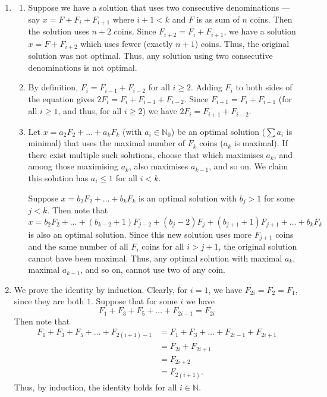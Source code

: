 \documentclass[12 pt, letterpaper]{hmcpset}
\begin{document}
\begin{solution}
	\begin{enumerate}
		\item \begin{enumerate}
			\item Suppose we have a solution that uses two consecutive denominations --- say $x = F + F_{i} + F_{i + 1}$ where $i + 1 < k$ and $F$ is as sum of $n$ coins. Then the solution uses $n + 2$ coins. Since $F_{i + 2} = F_{i} + F_{i + 1}$, we have a solution $x = F + F_{i + 2}$ which uses fewer (exactly $n + 1$) coins. Thus, the original solution was not optimal. Thus, any solution using two consecutive denominations is not optimal.

			\item By definition, $F_{i} = F_{i - 1} + F_{i - 2}$ for all $i \ge 2$. Adding $F_{i}$ to both sides of the equation gives $2 F_{i} = F_{i} + F_{i - 1} + F_{i - 2}$. Since $F_{i + 1} = F_{i} + F_{i - 1}$ (for all $i \ge 1$, and thus, for all $i \ge 2$) we have $2 F_{i} = F_{i + 1} + F_{i - 2}$.
			\item Let $x = a_{2} F_{2} + \dots + a_{k} F_{k}$ (with $a_{i} \in \mathbb{N}_{0}$) be an optimal solution ($\sum a_{i}$ is minimal) that uses the maximal number of $F_{k}$ coins ($a_{k}$ is maximal). If there exist multiple such solutions, choose that which maximises $a_{k}$, and among those maximising $a_{k}$, also maximises $a_{k - 1}$, and so on. We claim this solution has $a_{i} \le 1$ for all $i < k$.

				Suppose $x = b_{2} F_{2} + \dots + b_{k} F_{k}$ is an optimal solution with $b_{j} > 1$ for some $j < k$. Then note that
				\[
					x = b_{2} F_{2} + \dots + (b_{k - 2} + 1) F_{j - 2} + (b_{j} - 2) F_{j} + (b_{j + 1} + 1) F_{j + 1} + \dots + b_{k} F_{k}
				\]
				is also an optimal solution. Since this new solution uses more $F_{j + 1}$ coins and the same number of all $F_{i}$ coins for all $i > j + 1$, the original solution cannot have been maximal. Thus, any optimal solution with maximal $a_{k}$, maximal $a_{k - 1}$, and so on, cannot use two of any coin.
		\end{enumerate}
	
		\item We prove the identity by induction. Clearly, for $i = 1$, we have $F_{2i} = F_{2} = F_{1}$, since they are both $1$. Suppose that for some $i$ we have
			\[
				F_{1} + F_{3} + F_{5} + \dots + F_{2i - 1} = F_{2i}
			\]
			Then note that
			\begin{align*}
				F_{1} + F_{3} + F_{5} + \dots + F_{2(i + 1) - 1} & = F_{1} + F_{3} + \dots + F_{2i - 1} + F_{2i + 1} \\
										 & = F_{2i} + F_{2i + 1} \\
										 & = F_{2i + 2} \\
										 & = F_{2(i + 1)}.
			\end{align*}
			Thus, by induction, the identity holds for all $i \in \mathbb{N}$.


\end{enumerate}
\end{solution}
\end{document}
